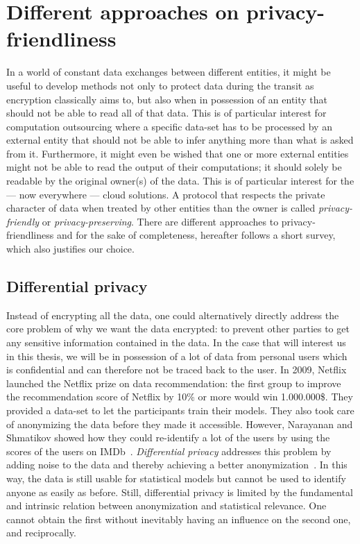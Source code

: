 \section{Different approaches on privacy-friendliness}
In a world of constant data exchanges between different entities, it might be useful to develop methods not only to protect data during the transit as encryption classically aims to, but also when in possession of an entity that should not be able to read all of that data. This is of particular interest for computation outsourcing where a specific data-set has to be processed by an external entity that should not be able to infer anything more than what is asked from it. Furthermore, it might even be wished that one or more external entities might not be able to read the output of their computations; it should solely be readable by the original owner(s) of the data. This is of particular interest for the --- now everywhere --- cloud solutions. A protocol that respects the private character of data when treated by other entities than the owner is called \emph{privacy-friendly} or \emph{privacy-preserving}. There are different approaches to privacy-friendliness and for the sake of completeness, hereafter follows a short survey, which also justifies our choice.

\subsection{Differential privacy}
Instead of encrypting all the data, one could alternatively directly address the core problem of why we want the data encrypted: to prevent other parties to get any sensitive information contained in the data. In the case that will interest us in this thesis, we will be in possession of a lot of data from personal users which is confidential and can therefore not be traced back to the user. In 2009, Netflix launched the Netflix prize on data recommendation: the first group to improve the recommendation score of Netflix by 10\% or more would win 1.000.000\$. They provided a data-set to let the participants train their models. They also took care of anonymizing the data before they made it accessible. However, Narayanan and Shmatikov showed how they could re-identify a lot of the users by using the scores of the users on IMDb~\cite{Narayanan2006HowDataset}. \emph{Differential privacy} addresses this problem by adding noise to the data and thereby achieving a better anonymization~\cite{Dwork2008DifferentialResults}. In this way, the data is still usable for statistical models but cannot be used to identify anyone as easily as before. Still, differential privacy is limited by the fundamental and intrinsic relation between anonymization and statistical relevance. One cannot obtain the first without inevitably having an influence on the second one, and reciprocally.

